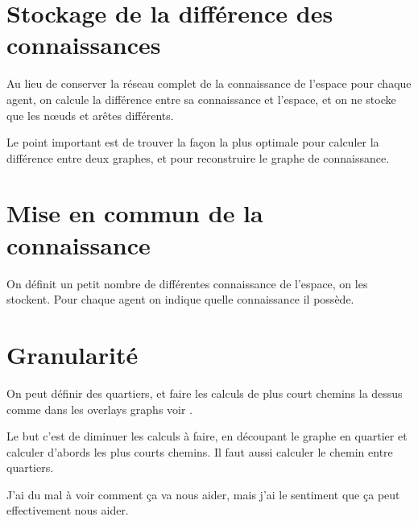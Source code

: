 \documentclass[a4paper]{article}
\begin{document}
\section{Stockage de la différence des connaissances}

Au lieu de conserver la réseau complet de la connaissance de l'espace pour
chaque agent, on calcule la différence entre sa connaissance et l'espace, et
on ne stocke que les nœuds et arêtes différents.

Le point important est de trouver la façon la plus optimale pour calculer la
différence entre deux graphes, et pour reconstruire le graphe de connaissance.

\section{Mise en commun de la connaissance}

On définit un petit nombre de différentes connaissance de l'espace, on les
stockent. Pour chaque agent on indique quelle connaissance il possède.

\section{Granularité}

On peut définir des quartiers, et faire les calculs de plus court chemins la
dessus comme dans les overlays graphs voir \cite{holzer2009}.

Le but c'est de diminuer les calculs à faire, en découpant le graphe en quartier
et calculer d'abords les plus courts chemins. Il faut aussi calculer le chemin
entre quartiers.

J'ai du mal à voir comment ça va nous aider, mais j'ai le sentiment que ça peut
effectivement nous aider.

 
\end{document}
